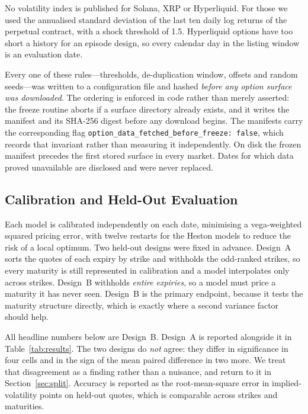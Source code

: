 \documentclass[runningheads]{llncs}
\begin{document}
No volatility index is published for Solana, XRP or Hyperliquid. For those we
used the annualised standard deviation of the last ten daily log returns of the
perpetual contract, with a shock threshold of 1.5. Hyperliquid options have too
short a history for an episode design, so every calendar day in the listing
window is an evaluation date.

Every one of these rules---thresholds, de-duplication window, offsets and
random seeds---was written to a configuration file and hashed \emph{before any
option surface was downloaded}. The ordering is enforced in code rather than
merely asserted: the freeze routine aborts if a surface directory already
exists, and it writes the manifest and its SHA-256 digest before any download
begins. The manifests carry the corresponding flag
\texttt{option\_data\_\allowbreak fetched\_\allowbreak before\_\allowbreak freeze: false}, which records that
invariant rather than measuring it independently. On disk the frozen manifest
precedes the first stored surface in every market. Dates for which data proved
unavailable are disclosed and were never replaced.

\subsection{Calibration and Held-Out Evaluation}

Each model is calibrated independently on each date, minimising a
vega-weighted squared pricing error, with twelve restarts for the Heston models
to reduce the risk of a local optimum. Two held-out designs were fixed in
advance. Design~A sorts the quotes of each expiry by strike and withholds the
odd-ranked strikes, so every maturity is still represented in calibration and a
model interpolates only across strikes. Design~B withholds \emph{entire
expiries}, so a model must price a maturity it has never seen. Design~B is the
primary endpoint, because it tests the maturity structure directly, which is
exactly where a second variance factor should help.

All headline numbers below are Design~B. Design~A is reported alongside it in Table~\ref{tab:results}. The two designs do \emph{not} agree: they differ in
significance in four cells and in the sign of the mean paired difference in two
more. We treat that disagreement as a finding rather than a nuisance, and
return to it in Section~\ref{sec:split}. Accuracy is reported as the
root-mean-square error in implied-volatility points on held-out quotes, which
is comparable across strikes and maturities.
\end{document}
